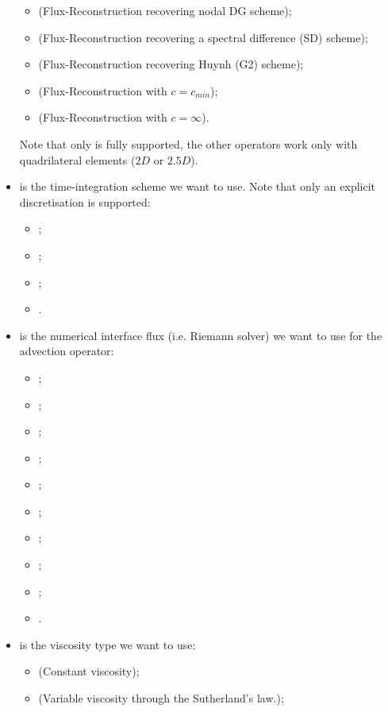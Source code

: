 \begin{itemize}
\begin{itemize}
\item {} (Flux-Reconstruction recovering nodal DG scheme);
\item {} (Flux-Reconstruction recovering a spectral difference (SD) scheme);
\item {} (Flux-Reconstruction recovering Huynh (G2) scheme);
\item {} (Flux-Reconstruction with $c = c_{min}$);
\item {} (Flux-Reconstruction with $c = \infty$).
\end{itemize}
Note that only  is fully supported, the other operators work only with quadrilateral elements ($2D$ or $2.5D$).
\item {} is the time-integration scheme we want to use.
Note that only an explicit discretisation is supported:
\begin{itemize}
\item {};
\item {};
\item {};
\item {}.
\end{itemize}
\item {} is the numerical interface flux (i.e. Riemann solver)
we want to use for the advection operator:
\begin{itemize}
\item {};
\item {};
\item {};
\item {};
\item {};
\item {};
\item {};
\item {};
\item {};
\item {}.
\end{itemize}
\item {} is the viscosity type we want to use:
\begin{itemize}
\item {} (Constant viscosity);
\item {} (Variable viscosity through the Sutherland's law.);
\end{itemize}

\end{itemize}
